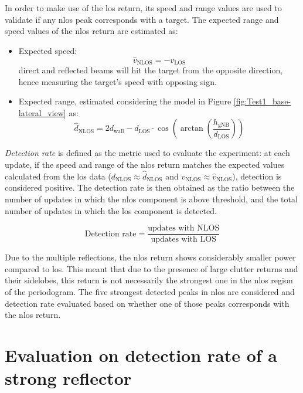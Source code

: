In order to make use of the \gls{los} return, its speed and range values are used to validate if any \gls{nlos} peak corresponds with a target.
The expected range and speed values of the \gls{nlos} return are estimated as:

\begin{itemize}
	\item Expected speed:
	$$ \hat{v}_{\text{NLOS}} = -v_{\text{LOS}}$$
	direct and reflected beams will hit the target from the opposite direction, hence measuring the target's speed with opposing sign.
	\item Expected range, estimated considering the model in Figure \ref{fig:Test1_base-lateral_view} as:
	$$ \hat{d}_{\text{NLOS}} = 2 d_{\text{wall}} - d_{\text{LOS}}\cdot \cos{\left(\arctan{\left(\frac{h_{\text{gNB}}}{d_{\text{LOS}}}\right)}\right)}$$
\end{itemize}

\textit{Detection rate} is defined as the metric used to evaluate the experiment: at each update, if the speed and range of the \gls{nlos} return matches the expected values calculated from the \gls{los} data ($d_{\text{NLOS}} \approx  \hat{d}_{\text{NLOS}}$ and $v_{\text{NLOS}} \approx \hat{v}_{\text{NLOS}}$), detection is considered positive.
The detection rate is then obtained as the ratio between the number of updates in which the \gls{nlos} component is above threshold, and the total number of updates in which the \gls{los} component is detected.


\begin{equation*}
	\text{Detection rate} = \frac{\text{updates with NLOS}}{\text{updates with LOS}}
\end{equation*}

Due to the multiple reflections, the \gls{nlos} return shows considerably smaller power compared to \gls{los}.
This meant that due to the presence of large clutter returns and their sidelobes, this return is not necessarily the strongest one in the \gls{nlos} region of the periodogram.
The five strongest detected peaks in \gls{nlos} are considered and detection rate evaluated based on whether one of those peaks corresponds with the \gls{nlos} return.
\section{Evaluation on detection rate of a strong reflector}

